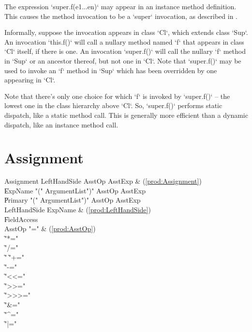 The expression \xcd`super.f(e1...en)` may appear in an instance method
definition.   This causes the method invocation to be a \xcd`super`
invocation, as described in .  

Informally, suppose the invocation appears in class \xcd`Cl`, which extends
class \xcd`Sup`. An invocation \xcd`this.f()` will call a nullary method named
\xcd`f` that appears in class \xcd`Cl` itself, if there is one.  An invocation
\xcd`super.f()` will call the nullary  \xcd`f` method in \xcd`Sup` or an
ancestor thereof, but not one in \xcd`Cl`.  Note that \xcd`super.f()` may be
used to invoke an \xcd`f` method in \xcd`Sup` which has been overridden by one
appearing in \xcd`Cl`.  

Note that there's only one choice for which \xcd`f` is invoked by
\xcd`super.f()` -- \viz{} the lowest one in the class hierarchy above
\xcd`Cl`.  So, \xcd`super.f()` performs static dispatch, like a static 
method call. This is generally more efficient than a dynamic dispatch, like an
instance method call.

\section{Assignment}\label{AssignmentStatement}

\begin{bbgrammar}
          Assignment \: LeftHandSide AsstOp AsstExp & (\ref{prod:Assignment}) \\
                     \| ExpName  \xcd"(" ArgumentList\opt \xcd")" AsstOp AsstExp \\
                     \| Primary  \xcd"(" ArgumentList\opt \xcd")" AsstOp AsstExp \\
        LeftHandSide \: ExpName & (\ref{prod:LeftHandSide}) \\
                     \| FieldAccess \\
              AsstOp \: \xcd"=" & (\ref{prod:AsstOp}) \\
                     \| \xcd"*=" \\
                     \| \xcd"/=" \\
                     \| \xcd"%
                     \| \xcd"+=" \\
                     \| \xcd"-=" \\
                     \| \xcd"<<=" \\
                     \| \xcd">>=" \\
                     \| \xcd">>>=" \\
                     \| \xcd"&=" \\
                     \| \xcd"^=" \\
                     \| \xcd"|=" \\
\end{bbgrammar}



